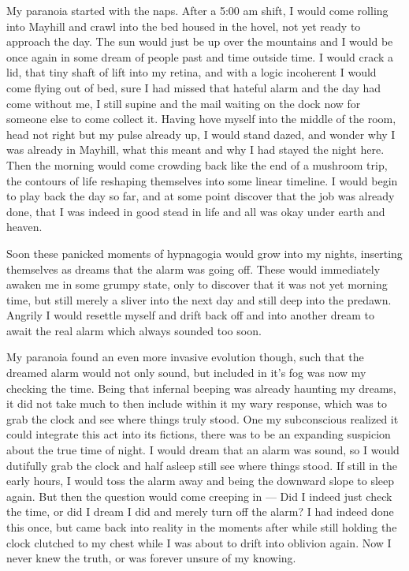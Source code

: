 \documentclass[ebook, 10pt, openright, onecolumn]{memoir}
\begin{document}
My paranoia started with the naps.  After a 5:00 am shift, I would come rolling
into Mayhill and crawl into the bed housed in the hovel, not yet ready to
approach the day.  The sun would just be up over the mountains and I would be
once again in some dream of people past and time outside time.  I would crack a
lid, that tiny shaft of lift into my retina, and with a logic incoherent I would
come flying out of bed, sure I had missed that hateful alarm and the day had
come without me, I still supine and the mail waiting on the dock now for someone
else to come collect it.  Having hove myself into the middle of the room, head
not right but my pulse already up, I would stand dazed, and wonder why I was
already in Mayhill, what this meant and why I had stayed the night here.  Then
the morning would come crowding back like the end of a mushroom trip, the
contours of life reshaping themselves into some linear timeline.  I would begin
to play back the day so far, and at some point discover that the job was already
done, that I was indeed in good stead in life and all was okay under earth and
heaven.

Soon these panicked moments of hypnagogia would grow into my nights, inserting
themselves as dreams that the alarm was going off.  These would immediately
awaken me in some grumpy state, only to discover that it was not yet morning
time, but still merely a sliver into the next day and still deep into the
predawn.  Angrily I would resettle myself and drift back off and into another
dream to await the real alarm which always sounded too soon.

My paranoia found an even more invasive evolution though, such that the dreamed
alarm would not only sound, but included in it's fog was now my checking the
time.  Being that infernal beeping was already haunting my dreams, it did not
take much to then include within it my wary response, which was to grab the
clock and see where things truly stood.  One my subconscious realized it could
integrate this act into its fictions, there was to be an expanding suspicion
about the true time of night.  I would dream that an alarm was sound, so I would
dutifully grab the clock and half asleep still see where things stood.  If still
in the early hours, I would toss the alarm away and being the downward slope to
sleep again.  But then the question would come creeping in --- Did I indeed just
check the time, or did I dream I did and merely turn off the alarm?  I had
indeed done this once, but came back into reality in the moments after while
still holding the clock clutched to my chest while I was about to drift into
oblivion again.  Now I never knew the truth, or was forever unsure of my
knowing.
\end{document}
